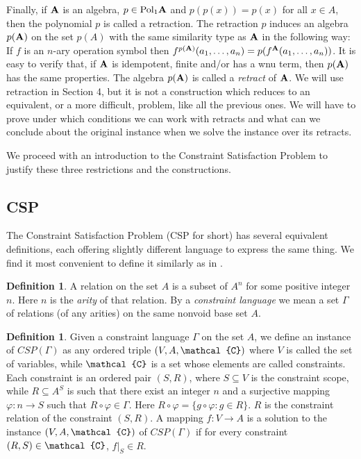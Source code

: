 \documentclass[11pt]{amsart}
\newcommand{\m}[1]{{\uppercase {\mathbf {#1}}}}
\newcommand{\sm}[1]{{\mbox{\scriptsize {\uppercase {\bf {#1}}}}}}
\newcommand{\vr}[1]{{\uppercase {\mathcal{#1}}}}
\newcommand{\poln}[2]{{\rm Pol_{#1}\m #2}}
\theoremstyle{definition}
\newtheorem{df}[thm]{Definition}
\begin{document}
Finally, if $\m a$ is an algebra, $p\in\poln{1}{a}$ and $p(p(x))=p(x)$ for all $x\in A$, then the polynomial $p$ is called a retraction. The retraction $p$ induces an algebra $p(\m a)$ on the set $p(A)$ with the same similarity type as $\m a$ in the following way: If $f$ is an $n$-ary operation symbol then $f^{p(\sm a)}(a_1,\dots,a_n) = p(f^{\sm a}(a_1,\dots,a_n))$. It is easy to verify that, if $\m a$ is idempotent, finite and/or has a wnu term, then $p(\m a)$ has the same properties. The algebra $p(\m a)$ is called a {\em retract} of $\m a$. We will use retraction in Section 4, but it is not a construction which reduces to an equivalent, or a more difficult, problem, like all the previous ones. We will have to prove under which conditions we can work with retracts and what can we conclude about the original instance when we solve the instance over its retracts.

We proceed with an introduction to the Constraint Satisfaction Problem to justify these three restrictions and the constructions.

\subsection{CSP} The Constraint Satisfaction Problem (CSP for short) has several equivalent definitions, each offering slightly different language to express the same thing. We find it most convenient to define it similarly as in \cite{barto-collapsewidth}.

\begin{df}\label{constraintlanguage}
A relation on the set $A$ is a subset of $A^n$ for some positive integer $n$. Here $n$ is the {\em arity} of that relation. By a {\em constraint language} we mean a set $\Gamma$ of relations (of any arities) on the same nonvoid base set $A$.
\end{df}

\begin{df}\label{csp}
Given a constraint language $\Gamma$ on the set $A$, we define an instance of $CSP(\Gamma)$ as any ordered triple $(V,A,\vr c)$ where $V$ is called the set of variables, while $\vr c$ is a set whose elements are called constraints. Each constraint is an ordered pair $(S,R)$, where $S\subseteq V$ is the constraint scope, while $R\subseteq A^S$ is such that there exist an integer $n$ and a surjective mapping $\varphi:n\rightarrow S$ such that $R\circ \varphi\in\Gamma$. Here $R\circ \varphi =\{g\circ \varphi:g\in R\}$. $R$ is the constraint relation of the constraint $(S,R)$. A mapping $f:V\rightarrow A$ is a solution to the instance $(V,A,\vr c)$ of $CSP(\Gamma)$ if for every constraint $(R,S)\in \vr c$, $f|_S\in R$.
\end{df}
\end{document}
